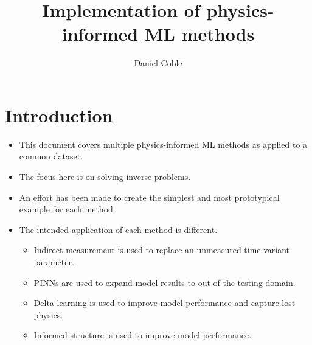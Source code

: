 \documentclass[letterpaper]{article}\usepackage{mathtools,amssymb,latexsym,graphics,enumerate}
\title{Implementation of physics-informed ML methods}
\author{Daniel Coble}
\numberwithin{equation}{section}
\numberwithin{remark}{section}
\numberwithin{lem}{section}
\begin{document}
	\maketitle
	\section{Introduction}
	\begin{itemize}
		\item This document covers multiple physics-informed ML methods as applied to a common dataset.
		\item The focus here is on solving inverse problems.
		\item An effort has been made to create the simplest and most prototypical example for each method.
		\item The intended application of each method is different.
		\begin{itemize}
			\item Indirect measurement is used to replace an unmeasured time-variant parameter.
			\item PINNs are used to expand model results to out of the testing domain.
			\item Delta learning is used to improve model performance and capture lost physics.
			\item Informed structure is used to improve model performance.
		\end{itemize}
	\end{itemize}
\end{document}
